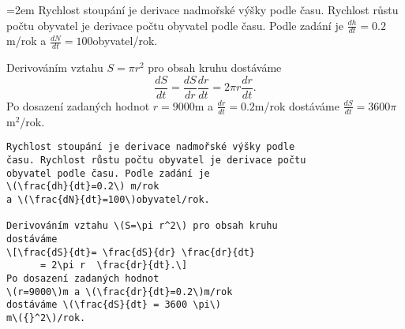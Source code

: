 \documentclass[10pt]{article}
\begin{document}
\begin{multicols}{2}
  \begin{minipage}{1.0\linewidth}
    \parindent=2em
Rychlost stoupání je derivace nadmořské výšky podle času. 
Rychlost růstu počtu obyvatel je derivace počtu obyvatel podle času.
Podle zadání je \(\frac{dh}{dt}=0.2\) m/rok
a \(\frac{dN}{dt}=100\)obyvatel/rok. 

Derivováním vztahu \(S=\pi r^2\) pro obsah kruhu dostáváme
\[\frac{dS}{dt}= \frac{dS}{dr} \frac{dr}{dt}=2\pi r  \frac{dr}{dt}.\]
Po dosazení zadaných hodnot 
\(r=9000\)m a \(\frac{dr}{dt}=0.2\)m/rok 
dostáváme \(\frac{dS}{dt} = 3600 \pi\) 
m\({}^2\)/rok.

  \end{minipage}

\columnbreak
  
\begin{lstlisting}
Rychlost stoupání je derivace nadmořské výšky podle 
času. Rychlost růstu počtu obyvatel je derivace počtu 
obyvatel podle času. Podle zadání je 
\(\frac{dh}{dt}=0.2\) m/rok
a \(\frac{dN}{dt}=100\)obyvatel/rok. 

Derivováním vztahu \(S=\pi r^2\) pro obsah kruhu 
dostáváme
\[\frac{dS}{dt}= \frac{dS}{dr} \frac{dr}{dt}
      = 2\pi r  \frac{dr}{dt}.\]
Po dosazení zadaných hodnot 
\(r=9000\)m a \(\frac{dr}{dt}=0.2\)m/rok 
dostáváme \(\frac{dS}{dt} = 3600 \pi\) 
m\({}^2\)/rok.

\end{lstlisting}

\end{multicols}
\end{document}
